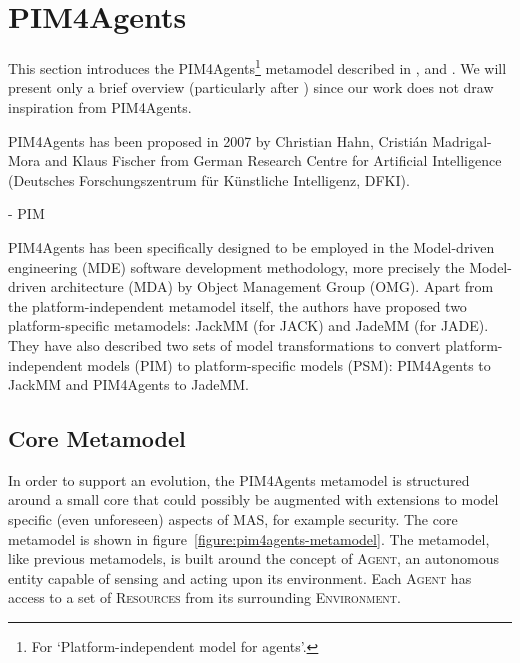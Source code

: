 \section{PIM4Agents}

This section introduces the PIM4Agents\footnote{For `Platform-independent model for agents'.} metamodel described in \cite{Hahn07a}, \cite{Hahn07b} and \cite{Hahn08}.
We will present only a brief overview (particularly after \cite{Hahn07b}) since our work does not draw inspiration from PIM4Agents.

PIM4Agents has been proposed in 2007 by Christian Hahn, Cristián Madrigal-Mora and Klaus Fischer from German Research Centre for Artificial Intelligence (Deutsches Forschungszentrum f\"{u}r K\"{u}nstliche Intelligenz, DFKI).


- PIM

PIM4Agents has been specifically designed to be employed in the Model-driven engineering (MDE) software development methodology, more precisely the Model-driven architecture (MDA) by Object Management Group (OMG).
Apart from the platform-independent metamodel itself, the authors have proposed two platform-specific metamodels: JackMM (for JACK) and JadeMM (for JADE).
They have also described two sets of model transformations to convert platform-independent models (PIM) to platform-specific models (PSM): PIM4Agents to JackMM and PIM4Agents to JadeMM.

\subsection*{Core Metamodel}

In order to support an evolution, the PIM4Agents metamodel is structured around a small core that could possibly be augmented with extensions to model specific (even unforeseen) aspects of MAS, for example security.
The core metamodel is shown in figure~\ref{figure:pim4agents-metamodel}.
The metamodel, like previous metamodels, is built around the concept of \textsc{Agent}, an autonomous entity capable of sensing and acting upon its environment.
Each \textsc{Agent} has access to a set of \textsc{Resources} from its surrounding \textsc{Environment}.

